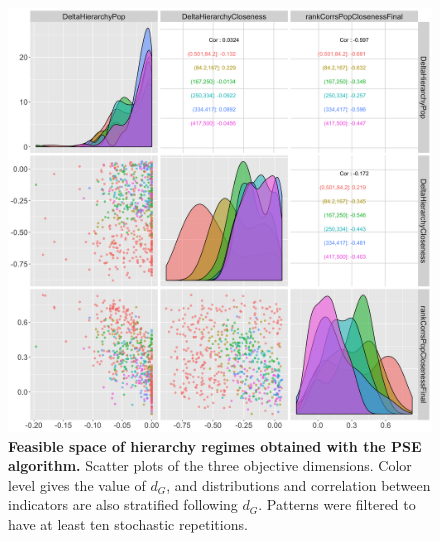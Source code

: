 \documentclass[11pt]{article}
\begin{document}



\begin{figure}
	\includegraphics[width=\linewidth]{Fig4.png}
	\caption{\textbf{Feasible space of hierarchy regimes obtained with the PSE algorithm.} Scatter plots of the three objective dimensions. Color level gives the value of $d_G$, and distributions and correlation between indicators are also stratified following $d_G$. Patterns were filtered to have at least ten stochastic repetitions.\label{fig:pse}}
\end{figure}
\end{document}
